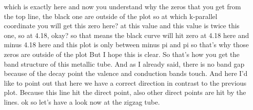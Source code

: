 which is exactly here and now you understand why the zeros that you get from the top line, the black one are outside of the plot so at which k-parallel coordinate you will get this zero here? at this value and this value is twice this one, so at 4.18, okay? so that means the black curve will hit zero at 4.18 here and minus 4.18 here and this plot is only between minus pi and pi so that's why those zeros are outside of the plot But I hope this is clear. So that's how you get the band structure of this metallic tube. And as I already said, there is no band gap because of the decay point the valence and conduction bands touch. And here I'd like to point out that here we have a correct direction in contrast to the previous plot. Because this line hit the direct point, also other direct points are hit by the lines. ok so let's have a look now at the zigzag tube.
